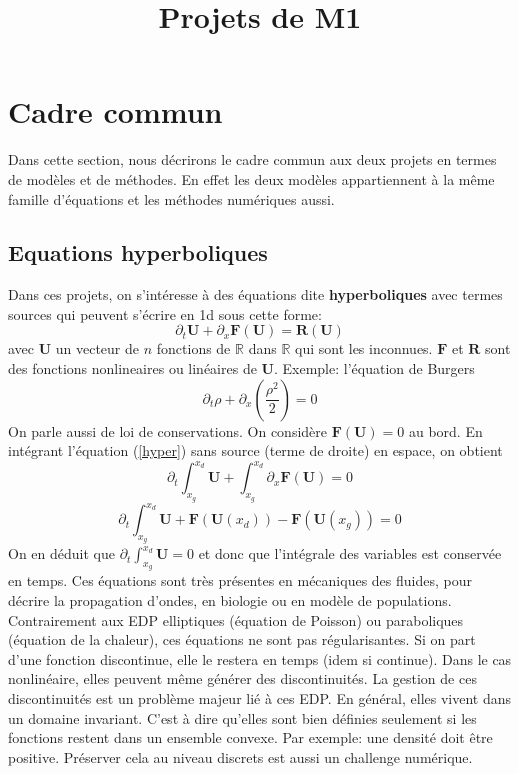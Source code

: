 \documentclass[11pt]{article}
\theoremstyle{definition}
\begin{document}
\title{Projets de M1}

\maketitle


\section{Cadre commun}
Dans cette section, nous décrirons le cadre commun aux deux projets en termes de modèles et de méthodes. En effet les deux modèles appartiennent à la même famille d'équations et les méthodes numériques aussi.

\subsection{Equations hyperboliques}
Dans ces projets, on s'intéresse à des équations dite \textbf{hyperboliques} avec termes sources qui peuvent s'écrire en 1d sous cette forme:
\begin{equation}\label{hyper}
\partial_t \mathbf{U} + \partial_x \mathbf{F}(\mathbf{U}) = \mathbf{R}(\mathbf{U})
\end{equation}
avec $\mathbf{U}$ un vecteur de $n$ fonctions de $\mathbb{R}$ dans  $\mathbb{R}$ qui sont les inconnues. $\mathbf{F}$ et $\mathbf{R}$ sont des fonctions nonlineaires ou linéaires de $\mathbf{U}$. Exemple: l'équation de Burgers
$$
\partial_t \rho + \partial_x \left(\frac{\rho^2}{2}\right)=0 
$$
On parle aussi de loi de conservations. On considère $\mathbf{F}(\mathbf{U})=0$ au bord. En intégrant l'équation (\ref{hyper}) sans source (terme de droite) en espace, on obtient
$$
\partial_t \int_{x_g}^{x_d}\mathbf{U} + \int_{x_g}^{x_d}\partial_x \mathbf{F}(\mathbf{U}) = 0
$$
$$
\partial_t \int_{x_g}^{x_d}\mathbf{U} + \mathbf{F}(\mathbf{U}(x_d)) - \mathbf{F}(\mathbf{U}(x_g)) = 0
$$
On en déduit que $\partial_t \int_{x_g}^{x_d}\mathbf{U}=0$ et donc que l'intégrale des variables est conservée en temps. Ces équations sont très présentes en mécaniques des fluides, pour décrire la propagation d'ondes, en biologie ou en modèle de populations. Contrairement aux EDP elliptiques (équation de Poisson) ou paraboliques (équation de la chaleur), ces équations ne sont pas régularisantes. Si on part d'une fonction discontinue, elle le restera en temps (idem si continue). Dans le cas nonlinéaire, elles peuvent même générer des discontinuités. La gestion de ces discontinuités est un problème majeur lié à ces EDP. En général, elles vivent dans un domaine invariant. C'est à dire qu'elles sont bien définies seulement si les fonctions restent dans un ensemble convexe. Par exemple: une densité doit être positive. Préserver cela au niveau discrets est aussi un challenge numérique.\\
\end{document}
